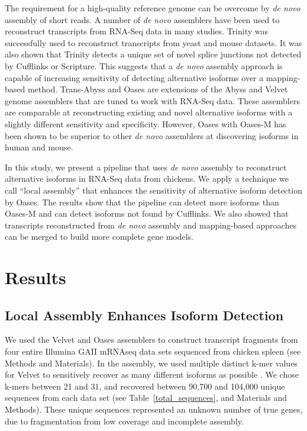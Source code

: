 \documentclass[10pt]{article}
\begin{document}
The requirement for a high-quality reference genome
can be overcome by {\em de novo} assembly of short reads.
A number of {\em de novo} assemblers have been used to reconstruct
transcripts from RNA-Seq data in many studies.
Trinity\cite{Grabherr:2011jb} was successfully used to reconstruct
transcripts from yeast and mouse datasets.  It was also shown that
Trinity detects a unique set of novel splice junctions not detected by
Cufflinks or Scripture.  This suggests that a {\em de novo} assembly
approach is capable of increasing sensitivity of detecting
alternative isoforms over a mapping-based method.
Trans-Abyss\cite{Robertson:2010ih} and Oases\cite{Schulz:2012je} are
extensions of the Abyss\cite{Simpson:2009iv} and
Velvet\cite{Zerbino:2008vu,Zerbino:2009jp} genome assemblers that are
tuned to work with RNA-Seq data.  These assemblers are comparable at
reconstructing existing and novel alternative isoforms with a slightly
different sensitivity and specificity.  However, Oases with Oases-M
has been shown to be superior to other {\em de novo} assemblers at
discovering isoforms in human and mouse\cite{Schulz:2012je}.

In this study, we present a pipeline that uses {\em de novo} assembly
to reconstruct alternative isoforms in RNA-Seq data from chickens.  We
apply a technique we call ``local assembly'' that enhances the sensitivity
of alternative isoform detection by Oases.  The results show that the
pipeline can detect more isoforms than Oases-M and can detect isoforms
not found by Cufflinks.  We also showed that transcripts reconstructed
from {\em de novo} assembly and mapping-based approaches can be merged
to build more complete gene models.

\section*{Results}

\subsection*{Local Assembly Enhances Isoform Detection}

We used the Velvet\cite{Zerbino:2008vu} and Oases\cite{Schulz:2012je}
assemblers to construct transcript fragments from four entire Illumina
GAII mRNAseq data sets sequenced from chicken spleen (see Methods and
Materials).  In the assembly, we used multiple distinct k-mer values
for Velvet to sensitively recover as many different isoforms as possible
\cite{Schulz:2012je}.  We chose k-mers between 21 and 31,
and recovered between 90,700 and 104,000 unique sequences from
each data set (see Table~\ref{total_sequences}, and Materials and
Methods).  These unique sequences represented an unknown number of
true genes, due to fragmentation from low coverage and incomplete
assembly.
\end{document}
